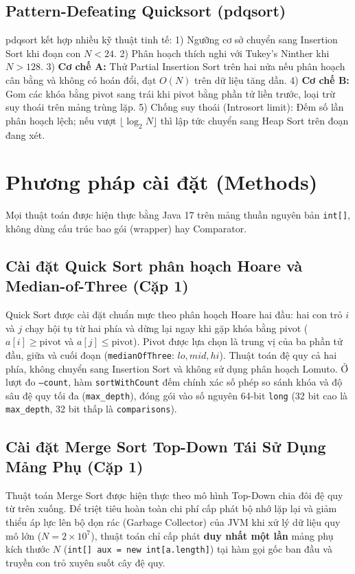 \documentclass[conference]{IEEEtran}
\begin{document}
\subsection{Pattern-Defeating Quicksort (pdqsort)}
pdqsort \cite{peters2021pdqsort} kết hợp nhiều kỹ thuật tinh tế:
1) Ngưỡng cơ sở chuyển sang Insertion Sort khi đoạn con $N < 24$.
2) Phân hoạch thích nghi với Tukey's Ninther \cite{bentley1993engineering} khi $N > 128$.
3) \textbf{Cơ chế A:} Thử Partial Insertion Sort trên hai nửa nếu phân hoạch cân bằng và không có hoán đổi, đạt $O(N)$ trên dữ liệu tăng dần.
4) \textbf{Cơ chế B:} Gom các khóa bằng pivot sang trái khi pivot bằng phần tử liền trước, loại trừ suy thoái trên mảng trùng lặp.
5) Chống suy thoái (Introsort limit): Đếm số lần phân hoạch lệch; nếu vượt $\lfloor \log_2 N \rfloor$ thì lập tức chuyển sang Heap Sort trên đoạn đang xét.

\section{Phương pháp cài đặt (Methods)}
Mọi thuật toán được hiện thực bằng Java 17 trên mảng thuần nguyên bản \texttt{int[]}, không dùng cấu trúc bao gói (wrapper) hay Comparator.

\subsection{Cài đặt Quick Sort phân hoạch Hoare và Median-of-Three (Cặp 1)}
Quick Sort được cài đặt chuẩn mực theo phân hoạch Hoare hai đầu: hai con trỏ $i$ và $j$ chạy hội tụ từ hai phía và dừng lại ngay khi gặp khóa bằng pivot ($a[i] \ge \text{pivot}$ và $a[j] \le \text{pivot}$). Pivot được lựa chọn là trung vị của ba phần tử đầu, giữa và cuối đoạn (\texttt{medianOfThree}: $lo, mid, hi$). Thuật toán đệ quy cả hai phía, không chuyển sang Insertion Sort và không sử dụng phân hoạch Lomuto. Ở lượt đo \texttt{--count}, hàm \texttt{sortWithCount} đếm chính xác số phép so sánh khóa và độ sâu đệ quy tối đa (\texttt{max\_depth}), đóng gói vào số nguyên 64-bit \texttt{long} (32 bit cao là \texttt{max\_depth}, 32 bit thấp là \texttt{comparisons}).

\subsection{Cài đặt Merge Sort Top-Down Tái Sử Dụng Mảng Phụ (Cặp 1)}
Thuật toán Merge Sort được hiện thực theo mô hình Top-Down chia đôi đệ quy từ trên xuống. Để triệt tiêu hoàn toàn chi phí cấp phát bộ nhớ lặp lại và giảm thiểu áp lực lên bộ dọn rác (Garbage Collector) của JVM khi xử lý dữ liệu quy mô lớn ($N = 2\times 10^7$), thuật toán chỉ cấp phát \textbf{duy nhất một lần} mảng phụ kích thước $N$ (\texttt{int[] aux = new int[a.length]}) tại hàm gọi gốc ban đầu và truyền con trỏ xuyên suốt cây đệ quy.
\end{document}
